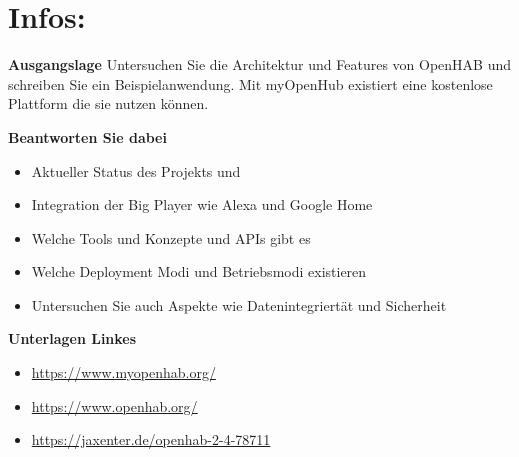 \section{Infos:}
\textbf{Ausgangslage}
Untersuchen Sie die Architektur und Features von OpenHAB und
schreiben Sie ein Beispielanwendung.
Mit myOpenHub existiert eine kostenlose Plattform die sie nutzen
können.

\textbf{Beantworten Sie dabei}
\begin{itemize}
 \item Aktueller Status des Projekts und  
 \item Integration der Big Player wie Alexa und Google Home
 \item Welche Tools und Konzepte und APIs gibt es
 \item Welche Deployment Modi und Betriebsmodi existieren
 \item Untersuchen Sie auch Aspekte wie Datenintegriertät und Sicherheit
\end{itemize}

\textbf{Unterlagen Linkes}
\begin{itemize}
	\item \url{https://www.myopenhab.org/}
	\item \url{https://www.openhab.org/}
	\item \url{https://jaxenter.de/openhab-2-4-78711}
\end{itemize}

